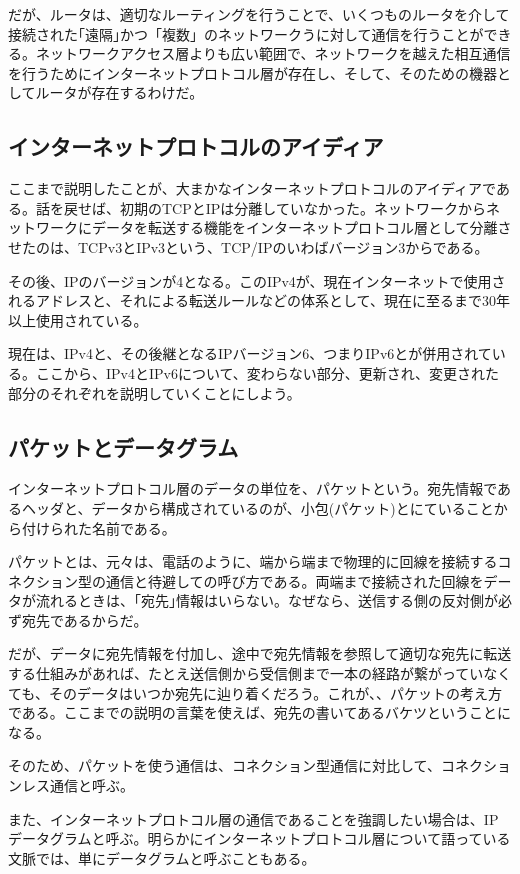 だが、ルータは、適切なルーティングを行うことで、いくつものルータを介して接続された｢遠隔｣かつ「複数」のネットワークうに対して通信を行うことができる。ネットワークアクセス層よりも広い範囲で、ネットワークを越えた相互通信を行うためにインターネットプロトコル層が存在し、そして、そのための機器としてルータが存在するわけだ。

\subsection{インターネットプロトコルのアイディア}

ここまで説明したことが、大まかなインターネットプロトコルのアイディアである。話を戻せば、初期のTCPとIPは分離していなかった。ネットワークからネットワークにデータを転送する機能をインターネットプロトコル層として分離させたのは、TCPv3とIPv3という、TCP/IPのいわばバージョン3からである。

その後、IPのバージョンが4となる。このIPv4が、現在インターネットで使用されるアドレスと、それによる転送ルールなどの体系として、現在に至るまで30年以上使用されている。

現在は、IPv4と、その後継となるIPバージョン6、つまりIPv6とが併用されている。ここから、IPv4とIPv6について、変わらない部分、更新され、変更された部分のそれぞれを説明していくことにしよう。

\subsection{パケットとデータグラム}

インターネットプロトコル層のデータの単位を、パケットという。宛先情報であるヘッダと、データから構成されているのが、小包(パケット)とにていることから付けられた名前である。

パケットとは、元々は、電話のように、端から端まで物理的に回線を接続するコネクション型の通信と待避しての呼び方である。両端まで接続された回線をデータが流れるときは、｢宛先｣情報はいらない。なぜなら、送信する側の反対側が必ず宛先であるからだ。

だが、データに宛先情報を付加し、途中で宛先情報を参照して適切な宛先に転送する仕組みがあれば、たとえ送信側から受信側まで一本の経路が繋がっていなくても、そのデータはいつか宛先に辿り着くだろう。これが、、パケットの考え方である。ここまでの説明の言葉を使えば、宛先の書いてあるバケツということになる。

そのため、パケットを使う通信は、コネクション型通信に対比して、コネクションレス通信と呼ぶ。

また、インターネットプロトコル層の通信であることを強調したい場合は、IPデータグラムと呼ぶ。明らかにインターネットプロトコル層について語っている文脈では、単にデータグラムと呼ぶこともある。

